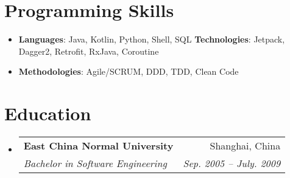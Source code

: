 \documentclass[letterpaper,11pt]{article}
\makeatletter
\newcommand{\resumeItem}[2]{
  \item\small{
    \textbf{#1}{: #2 \vspace{-2pt}}
  }
}
\newcommand{\resumeSubheading}[4]{
  \vspace{-1pt}\item
    \begin{tabular*}{0.97\textwidth}{l@{\extracolsep{\fill}}r}
      \textbf{#1} & #2 \\
      \textit{\small#3} & \textit{\small #4} \\
    \end{tabular*}\vspace{-5pt}
}
\newcommand{\resumeSubItem}[2]{\resumeItem{#1}{#2}\vspace{-4pt}}
\newcommand{\resumeSubHeadingListStart}{\begin{itemize}[leftmargin=*]}
\newcommand{\resumeSubHeadingListEnd}{\end{itemize}}
\makeatother
\begin{document}
%
\section{Programming Skills}
 \resumeSubHeadingListStart
   \resumeSubItem{Languages}
     {{Java, Kotlin, Python, Shell, SQL}
     \hfill
     \textbf{Technologies}{: Jetpack, Dagger2, Retrofit, RxJava, Coroutine}}
   \resumeSubItem{Methodologies}
     {Agile/SCRUM, DDD, TDD, Clean Code}
 \resumeSubHeadingListEnd


\section{Education}
  \resumeSubHeadingListStart
    \resumeSubheading
      {East China Normal University}{Shanghai, China}
      {Bachelor in Software Engineering}{Sep. 2005 -- July. 2009}
  \resumeSubHeadingListEnd
\end{document}

